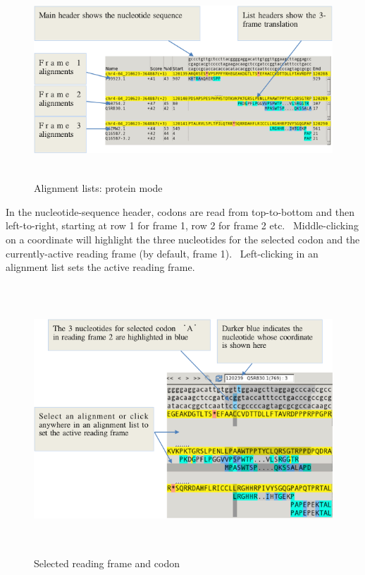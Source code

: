 \documentclass[letterpaper]{article}
\begin{document}
\begin{figure}
\centering
\color[rgb]{0.30980393,0.5058824,0.7411765}
\includegraphics[width=14.974cm,height=7.396cm]{img_view_alignment_details_protein.png}
\caption{Alignment lists: protein mode}
\end{figure}

\bigskip

{In the nucleotide-sequence header, codons are read from top-to-bottom
and then left-to-right, starting at row 1 for frame 1, row 2 for frame
2 etc. \ Middle-clicking on a coordinate will highlight the three
nucleotides for the selected codon and the currently-active reading
frame (by default, frame 1). \ Left-clicking in an alignment list sets
the active reading frame.}

\begin{figure}
\centering
\color[rgb]{0.30980393,0.5058824,0.7411765}
\includegraphics[width=15.177cm,height=10.1cm]{img_view_reading_frame.png}
\caption{Selected reading frame and codon}
\end{figure}
\end{document}
